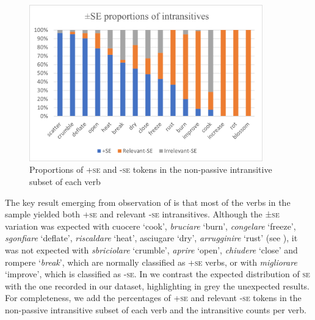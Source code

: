 \documentclass[output=paper,colorlinks,citecolor=brown
]{langscibook}
\begin{document}
\begin{figure}
\includegraphics[width=0.9\textwidth]{bentley_figure1.png}
\caption{\label{fig:bentley_figure_1}Proportions of +\textsc{se} and -\textsc{se} tokens in the non-passive intransitive subset of each verb}
\end{figure}    

The key result emerging from observation of  is that most of the verbs in the sample yielded both +\textsc{se} and relevant -\textsc{se} intransitives. Although the ±\textsc{se} variation was expected with cuocere ‘cook’, \textit{bruciare} ‘burn’, \textit{congelare} ‘freeze’, \textit{sgonfiare} ‘deflate’, \textit{riscaldare} ‘heat’, asciugare ‘dry’, \textit{arrugginire} ‘rust’ (see ), it was not expected with \textit{sbriciolare} ‘crumble’, \textit{aprire} ‘open’, \textit{chiudere} ‘close’ and rompere ‘\textit{break}’, which are normally classified as +\textsc{se} verbs, or with \textit{migliorare} ‘improve’, which is classified as -\textsc{se}. In  we contrast the expected distribution of \textsc{se} with the one recorded in our dataset, highlighting in grey the unexpected results. For completeness, we add the percentages of +\textsc{se} and relevant -\textsc{se} tokens in the non-passive intransitive subset of each verb and the intransitive counts per verb.
\end{document}
